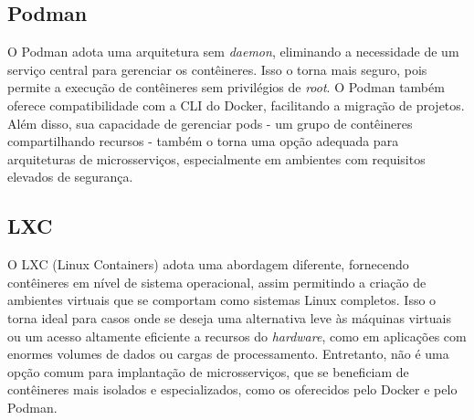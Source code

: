 
\subsection*{Podman}
O Podman adota uma arquitetura sem \emph{daemon}, eliminando a necessidade de um serviço central para gerenciar os contêineres. Isso o torna mais seguro, pois permite a execução de contêineres sem privilégios de \emph{root}. O Podman também oferece compatibilidade com a CLI do Docker, facilitando a migração de projetos. Além disso, sua capacidade de gerenciar pods - um grupo de contêineres compartilhando recursos - também o torna uma opção adequada para arquiteturas de microsserviços, especialmente em ambientes com requisitos elevados de segurança.

\subsection*{LXC}
O LXC (Linux Containers) adota uma abordagem diferente, fornecendo contêineres em nível de sistema operacional, assim permitindo a criação de ambientes virtuais que se comportam como sistemas Linux completos. Isso o torna ideal para casos onde se deseja uma alternativa leve às máquinas virtuais ou um acesso altamente eficiente a recursos do \emph{hardware}, como em aplicações com enormes volumes de dados ou cargas de processamento. Entretanto, não é uma opção comum para implantação de microsserviços, que se beneficiam de contêineres mais isolados e especializados, como os oferecidos pelo Docker e pelo Podman.




